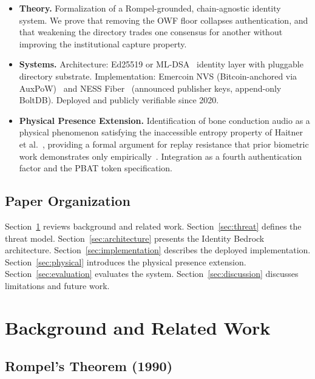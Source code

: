\documentclass[12pt,a4paper]{article}
\begin{document}
\begin{itemize}
  \item \textbf{Theory.} Formalization of a Rompel-grounded,
        chain-agnostic identity system. We prove that removing the OWF
        floor collapses authentication, and that weakening the directory
        trades one consensus for another without improving the
        institutional capture property.

  \item \textbf{Systems.} Architecture: Ed25519 or
        ML-DSA~\cite{FIPS204} identity layer with pluggable directory
        substrate. Implementation: Emercoin NVS (Bitcoin-anchored via
        AuxPoW)~\cite{Emercoin} and NESS Fiber~\cite{NESSFiber}
        (announced publisher keys, append-only BoltDB). Deployed and
        publicly verifiable since 2020.

  \item \textbf{Physical Presence Extension.} Identification of bone
        conduction audio as a physical phenomenon satisfying the
        inaccessible entropy property of Haitner et al.~\cite{Haitner10},
        providing a formal argument for replay resistance that prior
        biometric work demonstrates only
        empirically~\cite{HeadSonic25,HCRAuth24}. Integration as a
        fourth authentication factor and the PBAT token specification.
\end{itemize}

\subsection{Paper Organization}

Section~\ref{sec:background} reviews background and related work.
Section~\ref{sec:threat} defines the threat model.
Section~\ref{sec:architecture} presents the Identity Bedrock architecture.
Section~\ref{sec:implementation} describes the deployed implementation.
Section~\ref{sec:physical} introduces the physical presence extension.
Section~\ref{sec:evaluation} evaluates the system.
Section~\ref{sec:discussion} discusses limitations and future work.

\section{Background and Related Work}
\label{sec:background}

\subsection{Rompel's Theorem (1990)}
\end{document}
